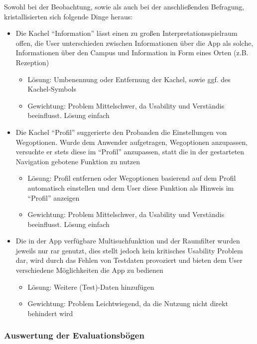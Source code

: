 Sowohl bei der Beobachtung, sowie als auch bei der anschließenden Befragung, kristallisierten sich folgende Dinge heraus:
\begin{itemize}
    \item Die Kachel “Information” lässt einen zu großen Interpretationsspielraum offen, die User unterschieden zwischen Informationen über die App als solche, Informationen über den Campus und Information in Form eines Orten (z.B. Rezeption)
    \begin{itemize}
        \item Lösung: Umbenennung oder Entfernung der Kachel, sowie ggf. des Kachel-Symbols
        \item Gewichtung: Problem Mittelschwer, da Usability und Verständis beeinflusst. Lösung einfach
    \end{itemize}
    \item Die Kachel “Profil” suggerierte den Probanden die Einstellungen von Wegoptionen. Wurde dem Anwender aufgetragen, Wegoptionen anzupassen, versuchte er stets diese im “Profil” anzupassen, statt die in der gestarteten Navigation gebotene Funktion zu nutzen
    \begin{itemize}
        \item Lösung: Profil entfernen oder Wegoptionen basierend auf dem Profil automatisch einstellen und dem User diese Funktion als Hinweis im “Profil” anzeigen
        \item Gewichtung: Problem Mittelschwer, da Usability und Verständis beeinflusst. Lösung einfach
    \end{itemize}
    \item Die in der App verfügbare Multisuchfunktion und der Raumfilter wurden jeweils nur rar genutzt, dies stellt jedoch kein kritisches Usability Problem dar, wird durch das Fehlen von Testdaten provoziert und bieten dem User verschiedene Möglichkeiten die App zu bedienen
    \begin{itemize}
        \item Lösung: Weitere (Test)-Daten hinzufügen
        \item Gewichtung: Problem Leichtwiegend, da die Nutzung nicht direkt behindert wird
    \end{itemize}
\end{itemize}

\subsubsection*{Auswertung der Evaluationsbögen}

